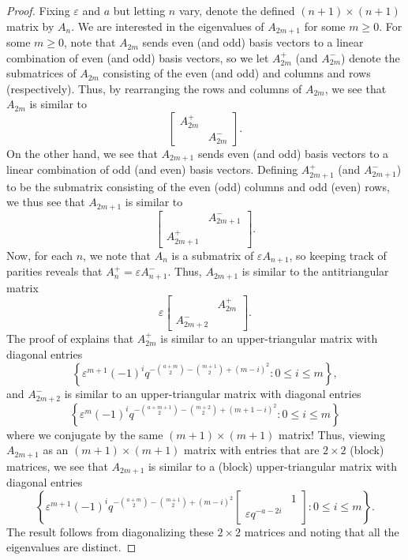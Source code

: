 \begin{proof}
    Fixing $\varepsilon$ and $a$ but letting $n$ vary, denote the defined $(n+1)\times(n+1)$ matrix by $A_n$. We are interested in the eigenvalues of $A_{2m+1}$ for some $m\ge0$. For some $m\ge0$, note that $A_{2m}$ sends even (and odd) basis vectors to a linear combination of even (and odd) basis vectors, so we let $A_{2m}^+$ (and $A_{2m}^-$) denote the submatrices of $A_{2m}$ consisting of the even (and odd) and columns and rows (respectively). Thus, by rearranging the rows and columns of $A_{2m}$, we see that $A_{2m}$ is similar to 
    \[\begin{bmatrix}
        A_{2m}^+ \\ & A_{2m}^-
    \end{bmatrix}.\]
    On the other hand, we see that $A_{2m+1}$ sends even (and odd) basis vectors to a linear combination of odd (and even) basis vectors. Defining $A_{2m+1}^+$ (and $A_{2m+1}^-$) to be the submatrix consisting of the even (odd) columns and odd (even) rows, we thus see that $A_{2m+1}$ is similar to
    \[\begin{bmatrix}
        & A_{2m+1}^- \\ A_{2m+1}^+
    \end{bmatrix}.\]
    Now, for each $n$, we note that $A_n$ is a submatrix of $\varepsilon A_{n+1}$, so keeping track of parities reveals that $A_n^+=\varepsilon A_{n+1}^-$. Thus, $A_{2m+1}$ is similar to the antitriangular matrix
    \[\varepsilon\begin{bmatrix}
        & A_{2m}^+ \\ A_{2m+2}^-
    \end{bmatrix}.\]
    The proof of  explains that $A_{2m}^+$ is similar to an upper-triangular matrix with diagonal entries
    \[\left\{\varepsilon^{m+1}(-1)^{i}q^{-\binom{a+m}2-\binom{m+1}2+\left(m-i\right)^2}:0\le i\le m\right\},\]
    and $A_{2m+2}^-$ is similar to an upper-triangular matrix with diagonal entries
    \[\left\{\varepsilon^{m}(-1)^{i}q^{-\binom{a+m+1}2-\binom{m+2}2+(m+1-i)^2}:0\le i\le m\right\}\]
    where we conjugate by the same $(m+1)\times(m+1)$ matrix! Thus, viewing $A_{2m+1}$ as an $(m+1)\times(m+1)$ matrix with entries that are $2\times2$ (block) matrices, we see that $A_{2m+1}$ is similar to a (block) upper-triangular matrix with diagonal entries
    \[\left\{\varepsilon^{m+1}(-1)^iq^{-\binom{a+m}2-\binom{m+1}2+(m-i)^2}\begin{bmatrix}
        & 1 \\
        \varepsilon q^{-a-2i}
    \end{bmatrix}:0\le i\le m\right\}.\]
    The result follows from diagonalizing these $2\times2$ matrices and noting that all the eigenvalues are distinct.
\end{proof}

